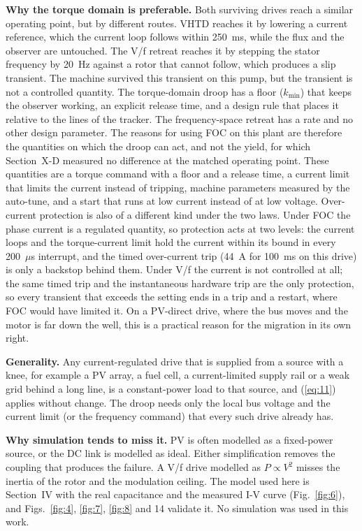 \documentclass[journal]{IEEEtran}
\begin{document}
\textbf{Why the torque domain is preferable.} Both surviving drives reach a similar operating point, but by different routes. VHTD reaches it by lowering a current reference, which the current loop follows within 250~ms, while the flux and the observer are untouched. The V/f retreat reaches it by stepping the stator frequency by 20~Hz against a rotor that cannot follow, which produces a slip transient. The machine survived this transient on this pump, but the transient is not a controlled quantity. The torque-domain droop has a floor ($k_{\min}$) that keeps the observer working, an explicit release time, and a design rule that places it relative to the lines of the tracker. The frequency-space retreat has a rate and no other design parameter. The reasons for using FOC on this plant are therefore the quantities on which the droop can act, and not the yield, for which Section~X-D measured no difference at the matched operating point. These quantities are a torque command with a floor and a release time, a current limit that limits the current instead of tripping, machine parameters measured by the auto-tune, and a start that runs at low current instead of at low voltage. Over-current protection is also of a different kind under the two laws. Under FOC the phase current is a regulated quantity, so protection acts at two levels: the current loops and the torque-current limit hold the current within its bound in every 200~$\mu$s interrupt, and the timed over-current trip (44~A for 100~ms on this drive) is only a backstop behind them. Under V/f the current is not controlled at all; the same timed trip and the instantaneous hardware trip are the only protection, so every transient that exceeds the setting ends in a trip and a restart, where FOC would have limited it. On a PV-direct drive, where the bus moves and the motor is far down the well, this is a practical reason for the migration in its own right.

\textbf{Generality.} Any current-regulated drive that is supplied from a source with a knee, for example a PV array, a fuel cell, a current-limited supply rail or a weak grid behind a long line, is a constant-power load to that source, and (\ref{eq:11}) applies without change. The droop needs only the local bus voltage and the current limit (or the frequency command) that every such drive already has.

\textbf{Why simulation tends to miss it.} PV is often modelled as a fixed-power source, or the DC link is modelled as ideal. Either simplification removes the coupling that produces the failure. A V/f drive modelled as $P \propto V^{2}$ misses the inertia of the rotor and the modulation ceiling. The model used here is Section~IV with the real capacitance and the measured I-V curve (Fig.~\ref{fig:6}), and Figs.~\ref{fig:4}, \ref{fig:7}, \ref{fig:8} and 14 validate it. No simulation was used in this work.
\end{document}
